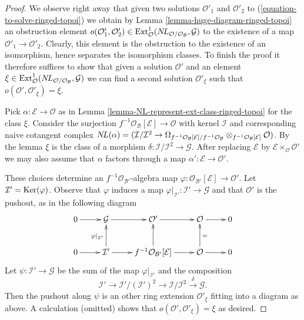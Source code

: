 \begin{proof}
We observe right away that given two solutions $\mathcal{O}'_1$ and
$\mathcal{O}'_2$ to (\ref{equation-to-solve-ringed-topoi}) we obtain by
Lemma \ref{lemma-huge-diagram-ringed-topoi} an obstruction element
$o(\mathcal{O}'_1, \mathcal{O}'_2) \in \mathop{\mathrm{Ext}}\nolimits^1_\mathcal{O}(
\mathop{N\!L}\nolimits_{\mathcal{O}/\mathcal{O}_\mathcal{B}}, \mathcal{G})$
to the existence of a map $\mathcal{O}'_1 \to \mathcal{O}'_2$.
Clearly, this element
is the obstruction to the existence of an isomorphism, hence separates
the isomorphism classes. To finish the proof it therefore suffices to
show that given a solution $\mathcal{O}'$ and an element
$\xi \in \mathop{\mathrm{Ext}}\nolimits^1_\mathcal{O}(
\mathop{N\!L}\nolimits_{\mathcal{O}/\mathcal{O}_\mathcal{B}}, \mathcal{G})$
we can find a second solution $\mathcal{O}'_\xi$ such that
$o(\mathcal{O}', \mathcal{O}'_\xi) = \xi$.

\medskip\noindent
Pick $\alpha : \mathcal{E} \to \mathcal{O}$ as in
Lemma \ref{lemma-NL-represent-ext-class-ringed-topoi}
for the class $\xi$. Consider the surjection
$f^{-1}\mathcal{O}_\mathcal{B}[\mathcal{E}] \to \mathcal{O}$
with kernel $\mathcal{I}$ and corresponding naive cotangent complex
$\mathop{N\!L}\nolimits(\alpha) = (\mathcal{I}/\mathcal{I}^2 \to
\Omega_{f^{-1}\mathcal{O}_\mathcal{B}[\mathcal{E}]/
f^{-1}\mathcal{O}_\mathcal{B}}
\otimes_{f^{-1}\mathcal{O}_\mathcal{B}[\mathcal{E}]} \mathcal{O})$.
By the lemma $\xi$ is the class of a morphism
$\delta : \mathcal{I}/\mathcal{I}^2 \to \mathcal{G}$.
After replacing $\mathcal{E}$ by
$\mathcal{E} \times_\mathcal{O} \mathcal{O}'$ we may also assume
that $\alpha$ factors through a map
$\alpha' : \mathcal{E} \to \mathcal{O}'$.

\medskip\noindent
These choices determine an $f^{-1}\mathcal{O}_{\mathcal{B}'}$-algebra map
$\varphi : \mathcal{O}_{\mathcal{B}'}[\mathcal{E}] \to \mathcal{O}'$.
Let $\mathcal{I}' = \mathop{\mathrm{Ker}}(\varphi)$.
Observe that $\varphi$ induces a map
$\varphi|_{\mathcal{I}'} : \mathcal{I}' \to \mathcal{G}$
and that $\mathcal{O}'$ is the pushout, as in the following
diagram
$$
\xymatrix{
0 \ar[r] & \mathcal{G} \ar[r] & \mathcal{O}' \ar[r] &
\mathcal{O} \ar[r] & 0 \\
0 \ar[r] & \mathcal{I}' \ar[u]^{\varphi|_{\mathcal{I}'}} \ar[r] &
f^{-1}\mathcal{O}_{\mathcal{B}'}[\mathcal{E}] \ar[u] \ar[r] &
\mathcal{O} \ar[u]_{=} \ar[r] & 0
}
$$
Let $\psi : \mathcal{I}' \to \mathcal{G}$ be the sum of the map
$\varphi|_{\mathcal{I}'}$ and the composition
$$
\mathcal{I}' \to \mathcal{I}'/(\mathcal{I}')^2 \to
\mathcal{I}/\mathcal{I}^2 \xrightarrow{\delta} \mathcal{G}.
$$
Then the pushout along $\psi$ is an other ring extension
$\mathcal{O}'_\xi$ fitting into a diagram as above.
A calculation (omitted) shows that $o(\mathcal{O}', \mathcal{O}'_\xi) = \xi$
as desired.
\end{proof}

